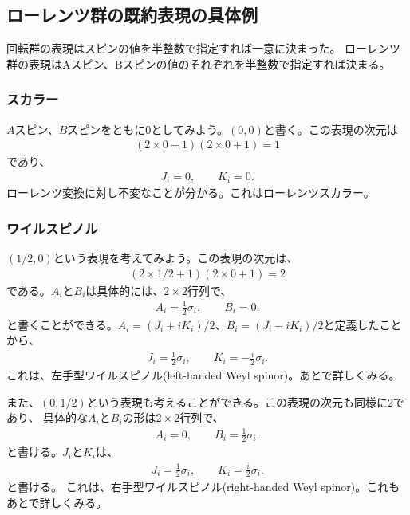 \documentclass[10pt,a4paper]{jarticle}
\begin{document}
\subsection{ローレンツ群の既約表現の具体例}
回転群の表現はスピンの値を半整数で指定すれば一意に決まった。
ローレンツ群の表現はAスピン、Bスピンの値のそれぞれを半整数で指定すれば決まる。


\subsubsection{スカラー}
$A$スピン、$B$スピンをともに0としてみよう。$(0,0)$と書く。この表現の次元は
\begin{align}
(2\times 0 + 1) (2\times 0 + 1) = 1
\end{align}
であり、
\begin{align}
J_i = 0, \qquad
K_i = 0.
\end{align}
ローレンツ変換に対し不変なことが分かる。これはローレンツスカラー。


\subsubsection{ワイルスピノル}
$(1/2,0)$という表現を考えてみよう。この表現の次元は、
\begin{align}
(2\times 1/2 + 1) (2\times 0 + 1) = 2
\end{align}
である。$A_i$と$B_i$は具体的には、$2\times 2$行列で、
\begin{align}
A_i = \frac{1}{2}\sigma_i, \qquad
B_i = 0.
\end{align}
と書くことができる。$A_i = (J_i + i K_i)/2$、$B_i = (J_i - i K_i)/2$と定義したことから、
\begin{align}
J_i = \frac{1}{2}\sigma_i, \qquad
K_i = -\frac{i}{2}\sigma_i.
\end{align}
これは、左手型ワイルスピノル(left-handed Weyl spinor)。あとで詳しくみる。

また、$(0,1/2)$という表現も考えることができる。この表現の次元も同様に$2$であり、
具体的な$A_i$と$B_i$の形は$2\times 2$行列で、
\begin{align}
A_i = 0, \qquad
B_i = \frac{1}{2}\sigma_i.
\end{align}
と書ける。$J_i$と$K_i$は、
\begin{align}
J_i = \frac{1}{2}\sigma_i, \qquad
K_i = \frac{i}{2}\sigma_i.
\end{align}
と書ける。
これは、右手型ワイルスピノル(right-handed Weyl spinor)。これもあとで詳しくみる。
\end{document}
